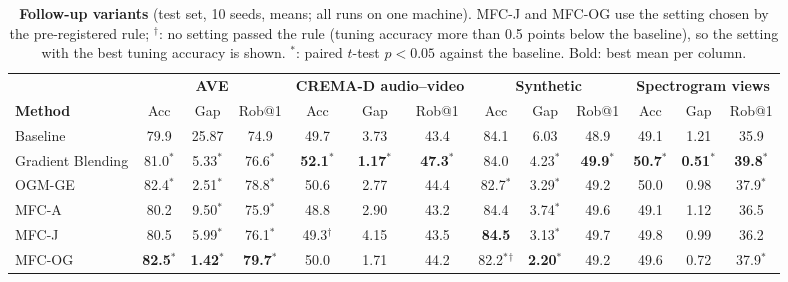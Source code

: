 \documentclass[fleqn,10pt]{wlscirep}
\providecommand{\DIFaddbegin}{} %
\providecommand{\DIFdelbegin}{} %
\providecommand{\DIFdelend}{} %
\begin{document}
\DIFdelbegin %
\DIFdelend \DIFaddbegin \begin{table}[t]
\caption{\textbf{Follow-up variants} (test set, 10 seeds, means; all runs on one machine). MFC-J and MFC-OG use the setting chosen by the pre-registered rule; $^{\dagger}$: no setting passed the rule (tuning accuracy more than 0.5 points below the baseline), so the setting with the best tuning accuracy is shown. $^{*}$: paired $t$-test $p<0.05$ against the baseline. Bold: best mean per column.}
\label{tab:variants}
\centering
\footnotesize
\setlength{\tabcolsep}{2.5pt}
\begin{tabular}{@{}lcccccccccccc@{}}
\toprule
& \multicolumn{3}{c}{\textbf{AVE}} & \multicolumn{3}{c}{\textbf{CREMA-D audio--video}} & \multicolumn{3}{c}{\textbf{Synthetic}} & \multicolumn{3}{c}{\textbf{Spectrogram views}} \\
\cmidrule(lr){2-4}\cmidrule(lr){5-7}\cmidrule(lr){8-10}\cmidrule(lr){11-13}
\textbf{Method} & Acc & Gap & Rob@1 & Acc & Gap & Rob@1 & Acc & Gap & Rob@1 & Acc & Gap & Rob@1 \\ \midrule
Baseline & 79.9 & 25.87 & 74.9 & 49.7 & 3.73 & 43.4 & 84.1 & 6.03 & 48.9 & 49.1 & 1.21 & 35.9 \\
Gradient Blending & 81.0$^{*}$ & 5.33$^{*}$ & 76.6$^{*}$ & \textbf{52.1$^{*}$} & \textbf{1.17$^{*}$} & \textbf{47.3$^{*}$} & 84.0 & 4.23$^{*}$ & \textbf{49.9$^{*}$} & \textbf{50.7$^{*}$} & \textbf{0.51$^{*}$} & \textbf{39.8$^{*}$} \\
OGM-GE & 82.4$^{*}$ & 2.51$^{*}$ & 78.8$^{*}$ & 50.6 & 2.77 & 44.4 & 82.7$^{*}$ & 3.29$^{*}$ & 49.2 & 50.0 & 0.98 & 37.9$^{*}$ \\
MFC-A & 80.2 & 9.50$^{*}$ & 75.9$^{*}$ & 48.8 & 2.90 & 43.2 & 84.4 & 3.74$^{*}$ & 49.6 & 49.1 & 1.12 & 36.5 \\
MFC-J & 80.5 & 5.99$^{*}$ & 76.1$^{*}$ & 49.3$^{\dagger}$ & 4.15 & 43.5 & \textbf{84.5} & 3.13$^{*}$ & 49.7 & 49.8 & 0.99 & 36.2 \\
MFC-OG & \textbf{82.5$^{*}$} & \textbf{1.42$^{*}$} & \textbf{79.7$^{*}$} & 50.0 & 1.71 & 44.2 & 82.2$^{*}$$^{\dagger}$ & \textbf{2.20$^{*}$} & 49.2 & 49.6 & 0.72 & 37.9$^{*}$ \\
\bottomrule
\end{tabular}
\end{table}
\end{document}
